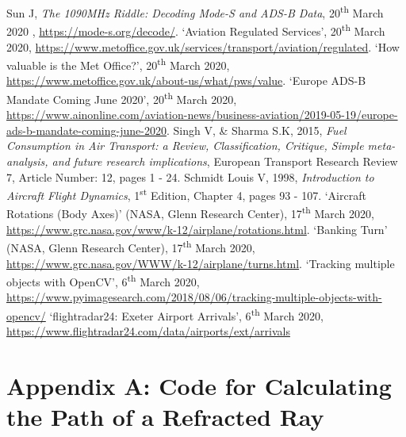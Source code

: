 \documentclass[11pt]{article}
\begin{document}
\cleardoublepage
\begin{thebibliography}{9}

 Sun J, \textit{The 1090MHz Riddle: Decoding Mode-S and ADS-B Data}, 20\textsuperscript{th} March 2020 , \url{https://mode-s.org/decode/}. 
 `Aviation Regulated Services', 20\textsuperscript{th} March 2020,  \url{https://www.metoffice.gov.uk/services/transport/aviation/regulated}.
 `How valuable is the Met Office?', 20\textsuperscript{th} March 2020,  \url{https://www.metoffice.gov.uk/about-us/what/pws/value}.
 `Europe ADS-B Mandate Coming June 2020', 20\textsuperscript{th} March 2020,  \url{https://www.ainonline.com/aviation-news/business-aviation/2019-05-19/europe-ads-b-mandate-coming-june-2020}.
 Singh V, \& Sharma S.K, 2015, \textit{Fuel Consumption in Air Transport: a Review, Classification, Critique, Simple meta-analysis, and future research implications}, European Transport Research Review 7, Article Number: 12, pages 1 - 24. 
 Schmidt Louis V, 1998, \textit{Introduction to Aircraft Flight Dynamics}, 1\textsuperscript{st} Edition, Chapter 4, pages 93 - 107.
 `Aircraft Rotations (Body Axes)' (NASA, Glenn Research Center), 17\textsuperscript{th} March 2020,  \url{https://www.grc.nasa.gov/www/k-12/airplane/rotations.html}.
 `Banking Turn' (NASA, Glenn Research Center), 17\textsuperscript{th} March 2020,  \url{https://www.grc.nasa.gov/WWW/k-12/airplane/turns.html}.
 `Tracking multiple objects with OpenCV', 6\textsuperscript{th} March 2020,  \url{https://www.pyimagesearch.com/2018/08/06/tracking-multiple-objects-with-opencv/}
 `flightradar24: Exeter Airport Arrivals', 6\textsuperscript{th} March 2020,  \url{https://www.flightradar24.com/data/airports/ext/arrivals}


\end{thebibliography}

\onecolumn
\appendix
\section*{Appendix A: Code for Calculating the Path of a Refracted Ray}
\label{app:appendix_A}
\end{document}
